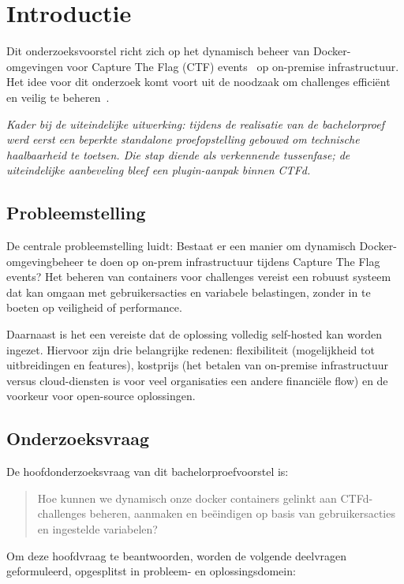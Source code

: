
\section{Introductie}%
\label{sec:introductie}

Dit onderzoeksvoorstel richt zich op het dynamisch beheer van Docker-omgevingen voor Capture The Flag (CTF) events~\autocite{Innovirtuoso2025} op on-premise infrastructuur. Het idee voor dit onderzoek komt voort uit de noodzaak om challenges efficiënt en veilig te beheren~\autocite{Singier2025}.

\textit{Kader bij de uiteindelijke uitwerking: tijdens de realisatie van de bachelorproef werd eerst een beperkte standalone proefopstelling gebouwd om technische haalbaarheid te toetsen. Die stap diende als verkennende tussenfase; de uiteindelijke aanbeveling bleef een plugin-aanpak binnen CTFd.}

\subsection{Probleemstelling}
De centrale probleemstelling luidt: Bestaat er een manier om dynamisch Docker-omgevingbeheer te doen op on-prem infrastructuur tijdens Capture The Flag events? Het beheren van containers voor challenges vereist een robuust systeem dat kan omgaan met gebruikersacties en variabele belastingen, zonder in te boeten op veiligheid of performance.

Daarnaast is het een vereiste dat de oplossing volledig self-hosted kan worden ingezet. Hiervoor zijn drie belangrijke redenen: flexibiliteit (mogelijkheid tot uitbreidingen en features), kostprijs (het betalen van on-premise infrastructuur versus cloud-diensten is voor veel organisaties een andere financiële flow) en de voorkeur voor open-source oplossingen.

\subsection{Onderzoeksvraag}
De hoofdonderzoeksvraag van dit bachelorproefvoorstel is:
\begin{quote}
	Hoe kunnen we dynamisch onze docker containers gelinkt aan CTFd-challenges beheren, aanmaken en beëindigen op basis van gebruikersacties en ingestelde variabelen?
\end{quote}

Om deze hoofdvraag te beantwoorden, worden de volgende deelvragen geformuleerd, opgesplitst in probleem- en oplossingsdomein:

